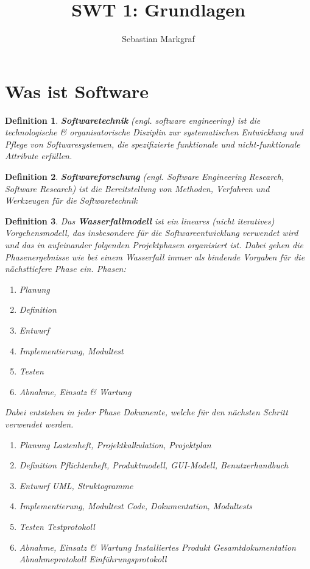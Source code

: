 \documentclass[a4paper]{article}
\title{SWT 1: Grundlagen}
\author{Sebastian Markgraf}
\theoremstyle{break}
\newtheorem{defi}{Definition}[section]
\begin{document}
\maketitle
\section {Was ist Software}
\begin {defi}
  \textbf{Softwaretechnik} (engl. software engineering) ist die technologische \& organisatorische Disziplin zur systematischen Entwicklung und Pflege von Softwaresystemen, die spezifizierte funktionale und nicht-funktionale Attribute erfüllen.
\end {defi}

\begin {defi}
  \textbf{Softwareforschung} (engl. Software Engineering Research, Software Research) ist die Bereitstellung von Methoden, Verfahren und Werkzeugen für die Softwaretechnik
\end {defi}


\begin {defi}
  Das \textbf{Wasserfallmodell} ist ein lineares (nicht iteratives) Vorgehensmodell, das insbesondere für die Softwareentwicklung verwendet wird und das in aufeinander folgenden Projektphasen organisiert ist. Dabei gehen die Phasenergebnisse wie bei einem Wasserfall immer als bindende Vorgaben für die nächsttiefere Phase ein.
  Phasen:
  \begin {enumerate}
  \item Planung
  \item Definition
  \item Entwurf
  \item Implementierung, Modultest
  \item Testen
  \item Abnahme, Einsatz \& Wartung
  \end {enumerate}
  Dabei entstehen in jeder Phase Dokumente, welche für den nächsten Schritt verwendet werden.
  \begin {enumerate}
  \item Planung
	  \subitem Lastenheft, Projektkalkulation, Projektplan
  \item Definition
	  \subitem Pflichtenheft, Produktmodell, GUI-Modell, Benutzerhandbuch
  \item Entwurf
	  \subitem UML, Struktogramme
  \item Implementierung, Modultest
	  \subitem Code, Dokumentation, Modultests
  \item Testen
	  \subitem Testprotokoll
  \item Abnahme, Einsatz \& Wartung
	  \subitem Installiertes Produkt
	  \subitem Gesamtdokumentation
	  \subitem Abnahmeprotokoll
      \subitem Einführungsprotokoll
    \end {enumerate}
\end {defi}
\end{document}
